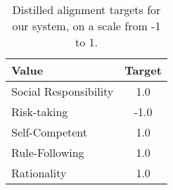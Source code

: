 \begin{table}[h]
    \centering
    \begin{tabular}{l|c}
    \toprule
    Value & Target \\
    \midrule
    Social Responsibility & 1.0 \\
    Risk-taking & -1.0 \\
    Self-Competent & 1.0 \\
    Rule-Following & 1.0 \\
    Rationality & 1.0 \\
    \bottomrule
    \end{tabular}
    \caption{Distilled alignment targets for our system, on a scale from -1 to 1.}
    \label{tab:alignment_targets_ours}
\end{table}
